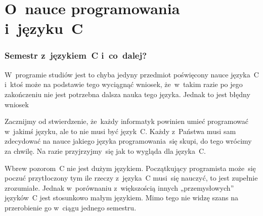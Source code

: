 \documentclass[10pt,t]{beamer}
\begin{document}










\section{O~nauce programowania i~języku~C}


\begin{frame}
  \frametitle{Semestr z~językiem~C i~co~dalej?}


  W~programie studiów jest to chyba jedyny przedmiot poświęcony nauce
  języka~C i~ktoś może na podstawie tego wyciągnąć wniosek, że~w~takim
  razie po jego zakończeniu nie jest potrzebna dalsza nauka tego języka.
  Jednak to jest błędny wniosek

  Zacznijmy od stwierdzenie, że~każdy informatyk powinien umieć programować
  w~jakimś języku, ale to \alert{nie} musi być język~C. Każdy z~Państwa
  musi sam zdecydować na nauce jakiego języka programowania~się skupi, do
  tego wrócimy za chwilę. Na razie przyjrzyjmy~się jak to wygląda
  dla języka~C.

  Wbrew pozorom~C nie jest dużym językiem. Początkujący programista może~się
  poczuć przytłoczony tym ile rzeczy z~języka~C musi~się nauczyć, to jest
  zupełnie zrozumiałe. Jednak w~porównaniu z~większością innych
  „przemysłowych” języków~C jest stosunkowo małym językiem. Mimo tego nie
  widzę szans na przerobienie go w~ciągu jednego semestru.

\end{frame}
\end{document}
